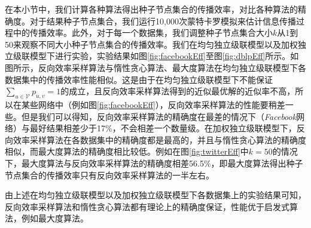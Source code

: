 在本小节中，我们计算各种算法得出种子节点集合的传播效率，对比各种算法的精确度。对于结果种子节点集合，我们运行10,000次蒙特卡罗模拟来估计信息传播过程中的传播效率。此外，对于每一个数据集，我们调整种子节点集合大小$k$从1到50来观察不同大小种子节点集合的传播效率。我们在均匀独立级联模型以及加权独立级联模型下进行实验，实验结果如图\ref{fig:facebookEff}至图\ref{fig:dblpEff}所示。如图所示，反向效率采样算法与惰性贪心算法、最大度算法在均匀独立级联模型下各数据集中的传播效率性能相似。这是由于在均匀独立级联模型下不能保证$\sum_{u \in \mathcal{V}}{p_{u,v}} = 1$的成立，且反向效率采样算法得到的近似最优解的近似率不高，所以在某些网络中（例如图\ref{fig:facebookEff}），反向效率采样算法的性能要稍差一些。但是我们可以得知，反向效率采样算法的精确度在最差的情况下（\textit{Facebook}网络）与最好结果相差少于17\%，不会相差一个数量级。在加权独立级联模型下，反向效率采样算法在各数据集中的精确度都是最高的，并且与惰性贪心算法的精确度相似，而最大度算法的精确度相比较低。例如在图\ref{fig:twitterEff}中$k=50$的情况下，最大度算法与反向效率采样算法的精确度相差56.5\%，即最大度算法得出种子节点集合的传播效率只有反向效率采样算法的一半左右。

由上述在均匀独立级联模型以及加权独立级联模型下各数据集上的实验结果可知，反向效率采样算法和惰性贪心算法都有理论上的精确度保证，性能优于启发式算法，例如最大度算法。

